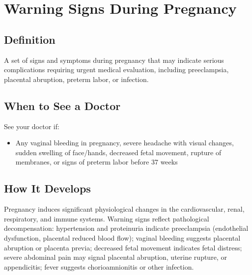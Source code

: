 \chapter{Warning Signs During Pregnancy}

\section*{Definition}
A set of signs and symptoms during pregnancy that may indicate serious complications requiring urgent medical evaluation, including preeclampsia, placental abruption, preterm labor, or infection.

\section*{When to See a Doctor}
See your doctor if:
\begin{itemize}
  \item Any vaginal bleeding in pregnancy, severe headache with visual changes, sudden swelling of face/hands, decreased fetal movement, rupture of membranes, or signs of preterm labor before 37 weeks
\end{itemize}

\section*{How It Develops}
Pregnancy induces significant physiological changes in the cardiovascular, renal, respiratory, and immune systems. Warning signs reflect pathological decompensation: hypertension and proteinuria indicate preeclampsia (endothelial dysfunction, placental reduced blood flow); vaginal bleeding suggests placental abruption or placenta previa; decreased fetal movement indicates fetal distress; severe abdominal pain may signal placental abruption, uterine rupture, or appendicitis; fever suggests chorioamnionitis or other infection.

